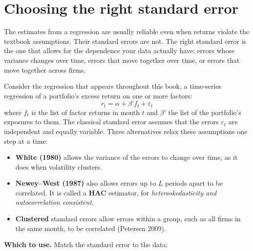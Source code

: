 \section{Choosing the right standard error}
\label{sec:03-se}

The estimates from a regression are usually reliable even when returns violate
the textbook assumptions. Their standard errors are not. The right standard
error is the one that allows for the dependence your data actually have: errors
whose variance changes over time, errors that move together over time, or
errors that move together across firms.

Consider the regression that appears throughout this book, a time-series
regression of a portfolio's excess return on one or more factors:
\begin{equation}
  r_t = \alpha + \beta' f_t + \varepsilon_t
  \label{eq:03-ts}
\end{equation}
where $f_t$ is the list of factor returns in month $t$ and $\beta'$ the list of
the portfolio's exposures to them. The classical standard error assumes that
the errors $\varepsilon_t$ are independent and equally variable. Three
alternatives relax these assumptions one step at a time:

\begin{itemize}
  \item \textbf{White (1980)} allows the variance of the errors to change over
  time, as it does when volatility clusters.
  \item \textbf{Newey--West (1987)} also allows errors up to $L$ periods apart
  to be correlated. It is called a \textbf{HAC} estimator, for
  \emph{heteroskedasticity and autocorrelation consistent}.
  \item \textbf{Clustered} standard errors allow errors within a group, such as
  all firms in the same month, to be correlated (Petersen 2009).
\end{itemize}

\textbf{Which to use.} Match the standard error to the data:


